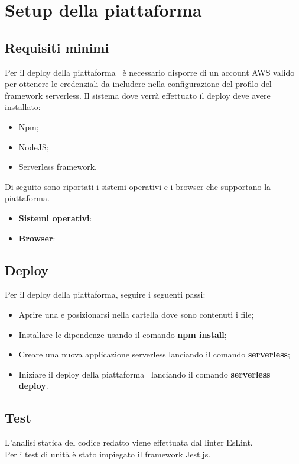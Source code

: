 \section{Setup della piattaforma}\label{Setup}
\subsection{Requisiti minimi}
Per il deploy della piattaforma \NomeProgetto\ è necessario disporre di un account AWS valido per ottenere le credenziali da includere nella configurazione del profilo del framework serverless.
Il sistema dove verrà effettuato il deploy deve avere installato:
\begin{itemize}
	\item Npm;
	\item NodeJS;
	\item Serverless framework.
\end{itemize}
Di seguito sono riportati i sistemi operativi e i browser che supportano la piattaforma.
\begin{itemize}
	\item \textbf{Sistemi operativi}:
	\item \textbf{Browser}:
\end{itemize}

\subsection{Deploy}
Per il deploy della piattaforma, seguire i seguenti passi:
\begin{itemize}
	\item Aprire una  e posizionarsi nella cartella dove sono contenuti i file;
	\item Installare le dipendenze usando il comando \textbf{npm install};
	\item Creare una nuova applicazione serverless lanciando il comando \textbf{serverless};
	\item Iniziare il deploy della piattaforma \NomeProgetto\ lanciando il comando \textbf{serverless deploy}.
\end{itemize}

\subsection{Test}
L'analisi statica del codice redatto viene effettuata dal linter EsLint.\\
Per i test di unità è stato impiegato il framework Jest.js.